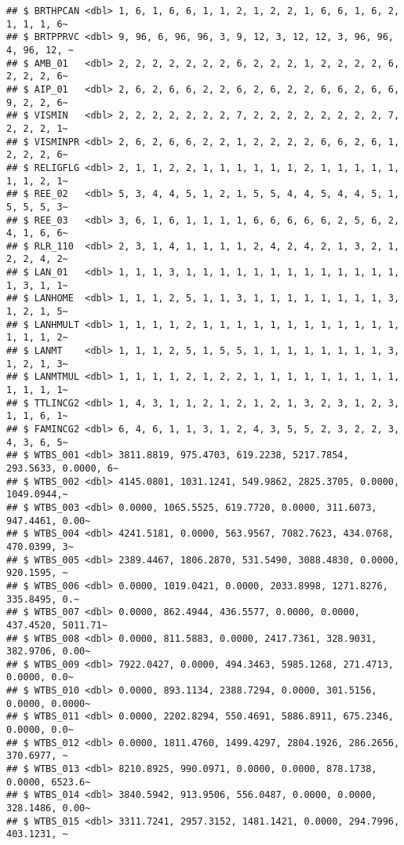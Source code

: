 \documentclass[
]{article}
\begin{document}
\begin{verbatim}
## $ BRTHPCAN <dbl> 1, 6, 1, 6, 6, 1, 1, 2, 1, 2, 2, 1, 6, 6, 1, 6, 2, 1, 1, 1, 6~
## $ BRTPPRVC <dbl> 9, 96, 6, 96, 96, 3, 9, 12, 3, 12, 12, 3, 96, 96, 4, 96, 12, ~
## $ AMB_01   <dbl> 2, 2, 2, 2, 2, 2, 2, 6, 2, 2, 2, 1, 2, 2, 2, 2, 6, 2, 2, 2, 6~
## $ AIP_01   <dbl> 2, 6, 2, 6, 6, 2, 2, 6, 2, 6, 2, 2, 6, 6, 2, 6, 6, 9, 2, 2, 6~
## $ VISMIN   <dbl> 2, 2, 2, 2, 2, 2, 2, 7, 2, 2, 2, 2, 2, 2, 2, 2, 7, 2, 2, 2, 1~
## $ VISMINPR <dbl> 2, 6, 2, 6, 6, 2, 2, 1, 2, 2, 2, 2, 6, 6, 2, 6, 1, 2, 2, 2, 6~
## $ RELIGFLG <dbl> 2, 1, 1, 2, 2, 1, 1, 1, 1, 1, 1, 2, 1, 1, 1, 1, 1, 1, 1, 2, 1~
## $ REE_02   <dbl> 5, 3, 4, 4, 5, 1, 2, 1, 5, 5, 4, 4, 5, 4, 4, 5, 1, 5, 5, 5, 3~
## $ REE_03   <dbl> 3, 6, 1, 6, 1, 1, 1, 1, 6, 6, 6, 6, 6, 2, 5, 6, 2, 4, 1, 6, 6~
## $ RLR_110  <dbl> 2, 3, 1, 4, 1, 1, 1, 1, 2, 4, 2, 4, 2, 1, 3, 2, 1, 2, 2, 4, 2~
## $ LAN_01   <dbl> 1, 1, 1, 3, 1, 1, 1, 1, 1, 1, 1, 1, 1, 1, 1, 1, 1, 1, 3, 1, 1~
## $ LANHOME  <dbl> 1, 1, 1, 2, 5, 1, 1, 3, 1, 1, 1, 1, 1, 1, 1, 1, 3, 1, 2, 1, 5~
## $ LANHMULT <dbl> 1, 1, 1, 1, 2, 1, 1, 1, 1, 1, 1, 1, 1, 1, 1, 1, 1, 1, 1, 1, 2~
## $ LANMT    <dbl> 1, 1, 1, 2, 5, 1, 5, 5, 1, 1, 1, 1, 1, 1, 1, 1, 3, 1, 2, 1, 3~
## $ LANMTMUL <dbl> 1, 1, 1, 1, 2, 1, 2, 2, 1, 1, 1, 1, 1, 1, 1, 1, 1, 1, 1, 1, 1~
## $ TTLINCG2 <dbl> 1, 4, 3, 1, 1, 2, 1, 2, 1, 2, 1, 3, 2, 3, 1, 2, 3, 1, 1, 6, 1~
## $ FAMINCG2 <dbl> 6, 4, 6, 1, 1, 3, 1, 2, 4, 3, 5, 5, 2, 3, 2, 2, 3, 4, 3, 6, 5~
## $ WTBS_001 <dbl> 3811.8819, 975.4703, 619.2238, 5217.7854, 293.5633, 0.0000, 6~
## $ WTBS_002 <dbl> 4145.0801, 1031.1241, 549.9862, 2825.3705, 0.0000, 1049.0944,~
## $ WTBS_003 <dbl> 0.0000, 1065.5525, 619.7720, 0.0000, 311.6073, 947.4461, 0.00~
## $ WTBS_004 <dbl> 4241.5181, 0.0000, 563.9567, 7082.7623, 434.0768, 470.0399, 3~
## $ WTBS_005 <dbl> 2389.4467, 1806.2870, 531.5490, 3088.4830, 0.0000, 920.1595, ~
## $ WTBS_006 <dbl> 0.0000, 1019.0421, 0.0000, 2033.8998, 1271.8276, 335.8495, 0.~
## $ WTBS_007 <dbl> 0.0000, 862.4944, 436.5577, 0.0000, 0.0000, 437.4520, 5011.71~
## $ WTBS_008 <dbl> 0.0000, 811.5883, 0.0000, 2417.7361, 328.9031, 382.9706, 0.00~
## $ WTBS_009 <dbl> 7922.0427, 0.0000, 494.3463, 5985.1268, 271.4713, 0.0000, 0.0~
## $ WTBS_010 <dbl> 0.0000, 893.1134, 2388.7294, 0.0000, 301.5156, 0.0000, 0.0000~
## $ WTBS_011 <dbl> 0.0000, 2202.8294, 550.4691, 5886.8911, 675.2346, 0.0000, 0.0~
## $ WTBS_012 <dbl> 0.0000, 1811.4760, 1499.4297, 2804.1926, 286.2656, 370.6977, ~
## $ WTBS_013 <dbl> 8210.8925, 990.0971, 0.0000, 0.0000, 878.1738, 0.0000, 6523.6~
## $ WTBS_014 <dbl> 3840.5942, 913.9506, 556.0487, 0.0000, 0.0000, 328.1486, 0.00~
## $ WTBS_015 <dbl> 3311.7241, 2957.3152, 1481.1421, 0.0000, 294.7996, 403.1231, ~

\end{verbatim}
\end{document}
